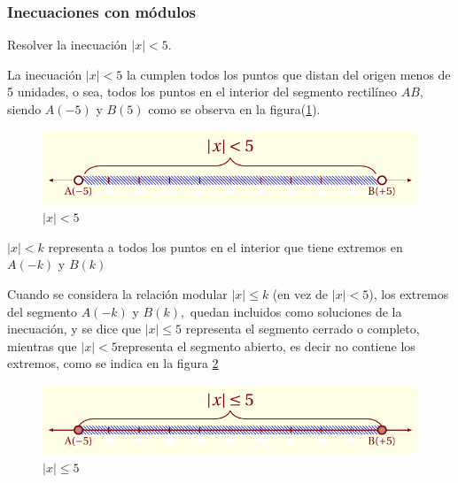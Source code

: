 \documentclass[oneside,english,spanish,2m,twoside,svgnames,x11names,HTML,twoside,12pt]{libro-matua}\usepackage[]{graphicx}\usepackage[]{color}
\newcommand{\val}[1]{\left|#1\right|}
\begin{document}
\subsubsection{Inecuaciones con módulos\label{subsec:Inecuaciones-con-m=0000F3dulos}}

\begin{ejemplo}

Resolver la inecuación $\val{x}<5$. 

\end{ejemplo}

\sol La inecuación $\val{x}<5$ la cumplen todos los puntos que distan
del origen menos de 5 unidades, o sea, todos los puntos en el interior
del segmento rectilíneo $AB$, siendo $A\left(-5\right)$ y $B\left(5\right)$
como se observa en la figura(\ref{fig:cal_lim3}). 

\begin{figure}[H]
\centering\includegraphics{4_home_antalcides_MEGA_calculo_I_libro_pdf_cal_lim3.pdf}\caption{$\val{x}<5$}\label{fig:cal_lim3}
\end{figure}
\fin

\general $\val{x}<k$ representa a todos los puntos en el interior
que tiene extremos en $A\left(-k\right)$ y $B\left(k\right)$ 

\begin{apunte} \obs

Cuando se considera la relación modular $\val{x}\leq k$ (en vez de
$\ensuremath{\val{x}<5}$), los extremos del segmento $A\left(-k\right)$
y $B\left(k\right),$ quedan incluidos como soluciones de la inecuación,
y se dice que $\ensuremath{\val{x}\leq5}$ representa el segmento
cerrado o completo, mientras que $\ensuremath{\val{x}<5}$representa
el segmento abierto, es decir no contiene los extremos, como se indica
en la figura \ref{fig:cal_lim3a} 

\begin{figure}[H]
\centering\includegraphics{5_home_antalcides_MEGA_calculo_I_libro_pdf_cal_lim3a.pdf}\caption{$\val{x}\leq 5$}\label{fig:cal_lim3a}
\end{figure}
\fin

\end{apunte}
\end{document}
